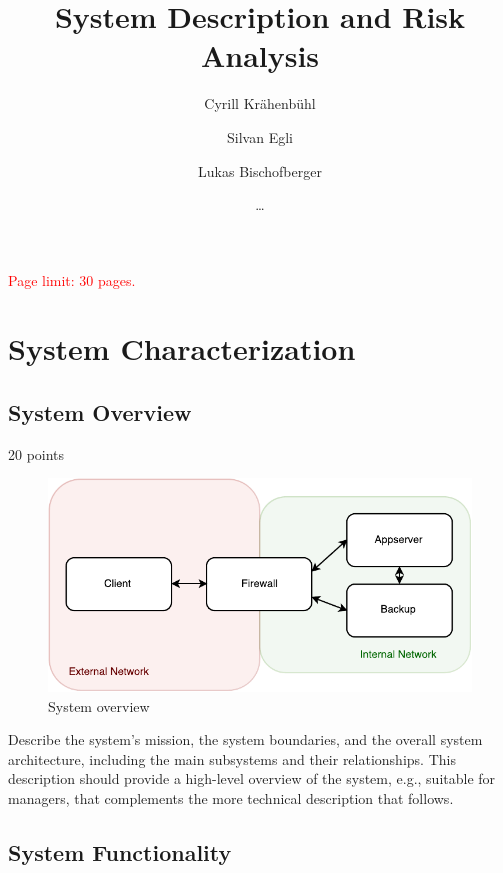 \documentclass[english]{article}
\title{\huge\sffamily\bfseries System Description and Risk Analysis}
\author{Cyrill Krähenbühl \and Silvan Egli \and Lukas Bischofberger}
\date{\dots}
\begin{document}
\maketitle

\begin{center}
{\large\textcolor{red}{Page limit: 30 pages.}}
\end{center}

\tableofcontents
\pagebreak


\section{System Characterization}

\subsection{System Overview}

20 points

\begin{figure}[ht]
	\centering
	\includegraphics[scale=0.7]{systemoverview.pdf}
	\caption{System overview}
	\label{figure:systemoverview}
\end{figure}

Describe the system's mission,  the system boundaries,
and the overall system architecture, including the main subsystems and
their relationships.   This description should provide a high-level
overview of the system, e.g., suitable for managers, that complements
the more technical description that follows.


\subsection{System Functionality}
\end{document}
